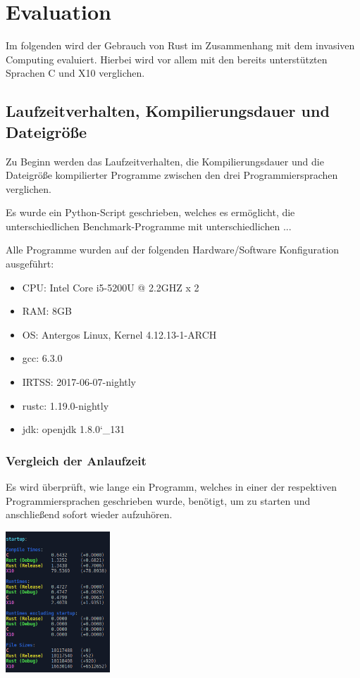 \chapter{Evaluation}\label{sec:eval}


Im folgenden wird der Gebrauch von Rust im Zusammenhang mit dem invasiven Computing evaluiert. Hierbei
wird vor allem mit den bereits unterstützten Sprachen C und X10 verglichen.

\section{Laufzeitverhalten, Kompilierungsdauer und Dateigröße}

Zu Beginn werden das Laufzeitverhalten, die Kompilierungsdauer und die Dateigröße kompilierter Programme zwischen
den drei Programmiersprachen verglichen.

Es wurde ein Python-Script geschrieben, welches es ermöglicht, die unterschiedlichen Benchmark-Programme mit unterschiedlichen
...

Alle Programme wurden auf der folgenden Hardware/Software Konfiguration ausgeführt:

\begin{itemize}
	\item{CPU: Intel Core i5-5200U @ 2.2GHZ x 2}
	\item{RAM: 8GB}
	\item{OS: Antergos Linux, Kernel 4.12.13-1-ARCH}
	\item{gcc: 6.3.0}
	\item{IRTSS: 2017-06-07-nightly}
	\item{rustc: 1.19.0-nightly}
	\item{jdk: openjdk 1.8.0\char`_131}
\end{itemize}

\subsection{Vergleich der Anlaufzeit}

Es wird überprüft, wie lange ein Programm, welches in einer der respektiven Programmiersprachen geschrieben wurde,
benötigt, um zu starten und anschließend sofort wieder aufzuhören.

\begin{center}
	\includegraphics[height=200px]{eval-screenshots/startup.png}  
\end{center}

